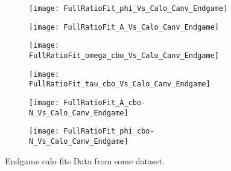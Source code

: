 \begin{figure}[]
\centering
    \begin{subfigure}[]{0.45\textwidth}
        \centering
        \texttt{[image: FullRatioFit\_phi\_Vs\_Calo\_Canv\_Endgame]}
        \caption{}
    \end{subfigure}%
    \begin{subfigure}[]{0.45\textwidth}
        \centering
        \texttt{[image: FullRatioFit\_A\_Vs\_Calo\_Canv\_Endgame]}
        \caption{}
    \end{subfigure}

    \begin{subfigure}[]{0.45\textwidth}
        \centering
        \texttt{[image: FullRatioFit\_omega\_cbo\_Vs\_Calo\_Canv\_Endgame]}
        \caption{}
    \end{subfigure}%
    \begin{subfigure}[]{0.45\textwidth}
        \centering
        \texttt{[image: FullRatioFit\_tau\_cbo\_Vs\_Calo\_Canv\_Endgame]}
        \caption{}
    \end{subfigure}

    \begin{subfigure}[]{0.45\textwidth}
        \centering
        \texttt{[image: FullRatioFit\_A\_cbo-N\_Vs\_Calo\_Canv\_Endgame]}
        \caption{}
    \end{subfigure}%
    \begin{subfigure}[]{0.45\textwidth}
        \centering
        \texttt{[image: FullRatioFit\_phi\_cbo-N\_Vs\_Calo\_Canv\_Endgame]}
        \caption{}
    \end{subfigure}
\caption[]{Endgame calo fits Data from some dataset.}
\label{fig:}
\end{figure}


